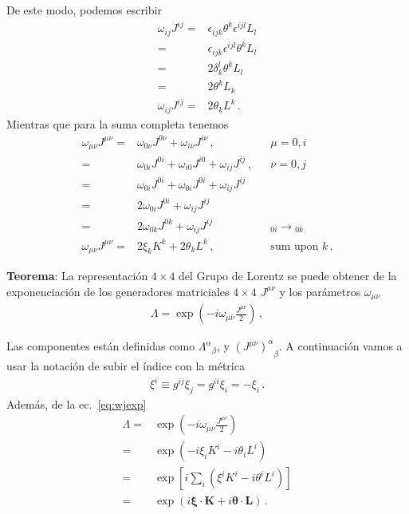 \begin{frame}
De este modo, podemos escribir
\begin{align}
  \omega_{ij} J^{ij}=&\epsilon_{ijk}\theta^{k} \epsilon^{ijl}L_l \nonumber\\
             =&\epsilon_{ijk} \epsilon^{ijl} \theta^k L_l \nonumber\\
             =&2 \delta_k^l\theta^k L_l \nonumber\\
             =&2 \theta^k L_k \nonumber\\
    \omega_{ij} J^{ij} =&2 \theta_k L^k \,.
\end{align}
Mientras que para la suma completa tenemos
\begin{align}
  \label{eq:wjexp}
  \omega_{\mu\nu}J^{\mu\nu}=&\omega_{0\nu}J^{0\nu}+\omega_{i\nu}J^{i\nu}\,,&& \mu=0,i \nonumber\\
                          =&\omega_{0i}J^{0i}+\omega_{i0}J^{i0}+\omega_{ij}J^{ij}\,,&&\nu=0,j \nonumber\\
                          =&\omega_{0i}J^{0i}+\omega_{0i}J^{0i}+\omega_{ij}J^{ij}&& \nonumber\\
                          =&2\omega_{0i}J^{0i}+\omega_{ij}J^{ij}&& \nonumber\\
                          =&2\omega_{0k}J^{0k}+\omega_{ij}J^{ij}&& {}_{0i}\to {}_{0k}\nonumber\\
 \omega_{\mu\nu}J^{\mu\nu}   =&2\xi_k K^k+2\theta_k L^k\,,&&\text{sum upon $k$}\,.
\end{align}


\noindent
\textbf{Teorema}:
  La representación $4\times 4$ del Grupo de Lorentz se puede obtener de la exponenciación de los generadores matriciales $4\times 4$ $J^{\mu\nu}$ y los parámetros $\omega_{\mu\nu}$
\begin{align}
  {\Lambda}=\exp\left(-i\omega_{\mu\nu}\frac{{J}^{\mu\nu}}{2}\right)\,,
\end{align}

Las componentes están definidas como  ${\Lambda^{\alpha}}_{\beta}$, y ${\left( J^{\mu\nu}\right)^{\alpha}}_{\beta}$.
A continuación vamos a usar la notación de subir el índice con la métrica
\begin{align*}
  \xi^i\equiv g^{ij}\xi_j=g^{ii}\xi_i=-\xi_i\,.
\end{align*}
Además, de la  ec.~\eqref{eq:wjexp} 
\begin{align}
  \label{eq:boostrot}
  \Lambda=&\exp\left(-i\omega_{\mu\nu}\frac{{J}^{\mu\nu}}{2}\right)\nonumber\\
=  &\exp \left(-i \xi_i K^i- i\theta_i L^i \right) \nonumber\\
=  &\exp \left[i \sum_i\left(   \xi^i K^i- i\theta^i L^i \right)\right] \nonumber\\
=&\exp \left(i\boldsymbol{\xi}\cdot \boldsymbol{K}
   + i\boldsymbol{\theta}\cdot \boldsymbol{L}\right)\,.
\end{align}


\end{frame}
